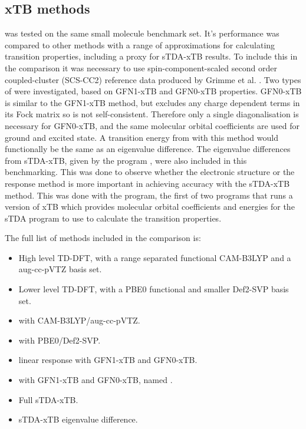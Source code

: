 \subsection{xTB methods}
\label{subsec:dscf_gfn_tests}
\dxtb was tested on the same small molecule benchmark set. It's performance was 
compared to other methods with a range of approximations for calculating transition
properties, including a proxy for sTDA-xTB results. To include this in the comparison
it was necessary to use spin-component-scaled second order coupled-cluster (SCS-CC2)
\cite{Hattig2000, Hellweg2008} reference data produced by Grimme et al. \cite{Grimme}.
Two types of \dxtb were investigated, based on GFN1-xTB and GFN0-xTB properties.
GFN0-xTB is similar to the GFN1-xTB method, but excludes any charge dependent terms
in its Fock matrix so is not self-consistent. Therefore only a single diagonalisation
is necessary for GFN0-xTB, and the same molecular orbital coefficients are used for
ground and excited state. A transition energy from \dscf with this method would
functionally be the same as an eigenvalue difference.
The eigenvalue differences from sTDA-xTB, given by the  program
\cite{Grimme2016}, were also included in this benchmarking. This was done to observe
whether the electronic structure or the response method is more important in achieving
accuracy with the sTDA-xTB method. This was done with the  program,
the first of two programs that runs a version of xTB which provides molecular orbital
coefficients and energies for the sTDA program to use to calculate the transition
properties.

The full list of methods included in the comparison is:
\begin{itemize}
    \item High level TD-DFT, with a range separated functional CAM-B3LYP and
     a aug-cc-pVTZ basis set.
    \item Lower level TD-DFT, with a PBE0 functional and smaller Def2-SVP basis set.
    \item \dscf with CAM-B3LYP/aug-cc-pVTZ.
    \item \dscf with PBE0/Def2-SVP.
    \item linear response with GFN1-xTB and GFN0-xTB.
    \item \dscf with GFN1-xTB and GFN0-xTB, named \dxtb.
    \item Full sTDA-xTB.
    \item sTDA-xTB eigenvalue difference.
\end{itemize}
 

